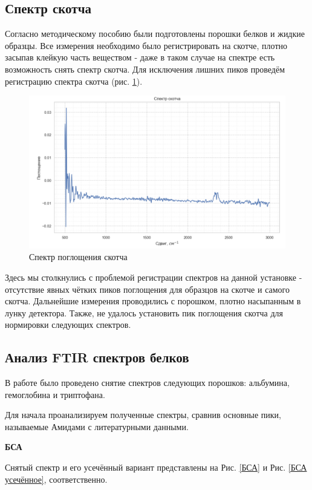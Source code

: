 \documentclass{article}
\begin{document}
\subsection{Спектр скотча}\;
\par Согласно методическому пособию были подготовлены порошки белков и жидкие образцы. Все измерения необходимо было регистрировать на скотче, плотно засыпав клейкую часть веществом - даже в таком случае на спектре есть возможность снять спектр скотча. Для исключения лишних пиков проведём регистрацию спектра скотча (рис. \ref{скотч}).
\begin{figure}[h!]
\centering
    \includegraphics[width=0.8\linewidth]{Images/скотч.png}
    \caption{Спектр поглощения скотча}
    \label{скотч}
\end{figure}
\par Здесь мы столкнулись с проблемой регистрации спектров на данной установке - отсутствие явных чётких пиков поглощения для образцов на скотче и самого скотча. Дальнейшие измерения проводились с порошком, плотно насыпанным в лунку детектора. Также, не удалось установить пик поглощения скотча для нормировки следующих спектров.
\subsection{Анализ FTIR спектров белков}\;
\par В работе было проведено снятие спектров следующих порошков: альбумина, гемоглобина и триптофана.

Для начала проанализируем полученные спектры, сравнив основные пики, называемые Амидами с литературными данными.

\textbf{БСА}

Снятый спектр и его усечённый вариант представлены на Рис. \ref{БСА} и Рис. \ref{БСА усечённое}, соответственно. 
\end{document}
